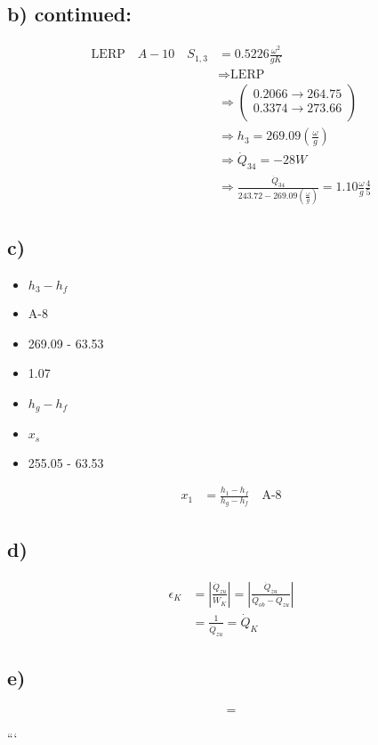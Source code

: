 \subsection*{b) continued:}

\begin{align*}
\text{LERP} \quad A-10 \quad S_{1,3} &= 0.5226 \frac{\omega^2}{gK} \\
&\Rightarrow \text{LERP} \\
&\Rightarrow \left( \begin{array}{c}
0.2066 \rightarrow 264.75 \\
0.3374 \rightarrow 273.66 \\
\end{array} \right) \\
&\Rightarrow h_3 = 269.09 \left( \frac{\omega}{g} \right) \\
&\Rightarrow \dot{Q}_{34} = -28W \\
&\Rightarrow \frac{\dot{Q}_{34}}{243.72 - 269.09 \left( \frac{\omega}{g} \right)} = 1.10 \frac{\omega}{g} \frac{4}{5}
\end{align*}

\subsection*{c)}



\begin{itemize}
    \item $h_3 - h_f$
    \item A-8
    \item 269.09 - 63.53
    \item 1.07
\end{itemize}


\begin{itemize}
    \item $h_g - h_f$
    \item $x_s$
    \item 255.05 - 63.53
\end{itemize}

\begin{align*}
x_1 &= \frac{h_1 - h_f}{h_g - h_f} \quad \text{A-8}
\end{align*}

\subsection*{d)}

\begin{align*}
\epsilon_K &= \left| \frac{\dot{Q}_{zu}}{\dot{W}_K} \right| = \left| \frac{\dot{Q}_{zu}}{\dot{Q}_{ob} - \dot{Q}_{zu}} \right| \\
&= \frac{1}{\dot{Q}_{zu}} = \dot{Q}_K
\end{align*}

\subsection*{e)}

\begin{align*}
=
\end{align*}

```